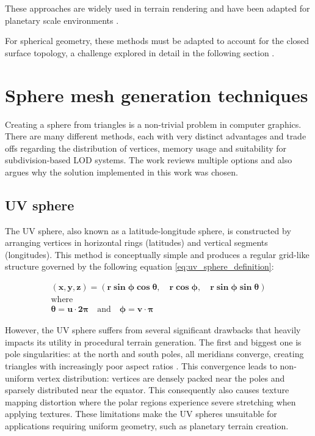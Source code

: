 \documentclass[12pt]{report}
\begin{document}
These approaches are widely used in terrain rendering and have been adapted for planetary scale environments \cite{doliveira2018, korn2017game}.

For spherical geometry, these methods must be adapted to account for the closed surface topology, a challenge explored in detail in the following section \cite{zechmann2025}.

\section{Sphere mesh generation techniques}

Creating a sphere from triangles is a non-trivial problem in computer graphics. There are many different methods, each with very distinct advantages and trade offs regarding the distribution of vertices, memory usage and suitability for subdivision-based LOD systems. The work reviews multiple options and also argues why the solution implemented in this work was chosen.

\subsection{UV sphere}

The UV sphere, also known as a latitude-longitude sphere, is constructed by arranging vertices in horizontal rings (latitudes) and vertical segments (longitudes). This method is conceptually simple and produces a regular grid-like structure governed by the following equation \ref{eq:uv_sphere_definition}:

\begin{equation}
\label{eq:uv_sphere_definition}
\begin{gathered}
    \mathbf{(x, y, z) = (r \sin \phi \cos \theta, \quad r \cos \phi, \quad r \sin \phi \sin \theta)} \\
    \text{where} \\
    \mathbf{\theta = u \cdot 2\pi} \quad \text{and} \quad \mathbf{\phi = v \cdot \pi}
\end{gathered}
\end{equation}

However, the UV sphere suffers from several significant drawbacks that heavily impacts its utility in procedural terrain generation. The first and biggest one is pole singularities: at the north and south poles, all meridians converge, creating triangles with increasingly poor aspect ratios \cite{lei2020}. This convergence leads to non-uniform vertex distribution: vertices are densely packed near the poles and sparsely distributed near the equator. This consequently also causes texture mapping distortion where the polar regions experience severe stretching when applying textures. These limitations make the UV spheres unsuitable for applications requiring uniform geometry, such as planetary terrain creation. 
\end{document}
